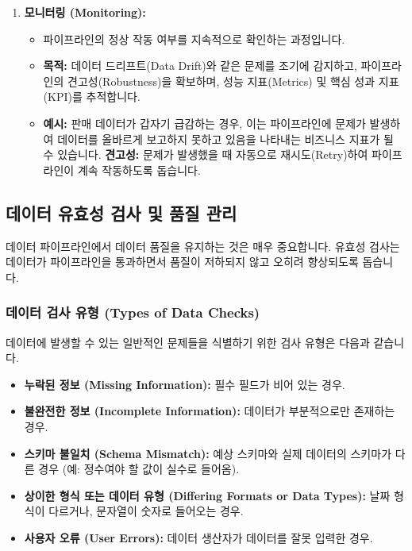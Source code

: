 \documentclass[11pt,a4paper]{article}
\theoremstyle{definition}
\begin{document}
\begin{enumerate}
\begin{enumerate}
    \item \textbf{모니터링 (Monitoring):}
    \begin{itemize}
        \item 파이프라인의 정상 작동 여부를 지속적으로 확인하는 과정입니다.
        \item \textbf{목적:} 데이터 드리프트(Data Drift)와 같은 문제를 조기에 감지하고, 파이프라인의 견고성(Robustness)을 확보하며, 성능 지표(Metrics) 및 핵심 성과 지표(KPI)를 추적합니다.
        \item \textbf{예시:} 판매 데이터가 갑자기 급감하는 경우, 이는 파이프라인에 문제가 발생하여 데이터를 올바르게 보고하지 못하고 있음을 나타내는 비즈니스 지표가 될 수 있습니다.
        \textbf{견고성:} 문제가 발생했을 때 자동으로 재시도(Retry)하여 파이프라인이 계속 작동하도록 돕습니다.
    \end{itemize}
\end{enumerate}

\subsection{데이터 유효성 검사 및 품질 관리}

데이터 파이프라인에서 데이터 품질을 유지하는 것은 매우 중요합니다. 유효성 검사는 데이터가 파이프라인을 통과하면서 품질이 저하되지 않고 오히려 향상되도록 돕습니다.

\subsubsection{데이터 검사 유형 (Types of Data Checks)}
데이터에 발생할 수 있는 일반적인 문제들을 식별하기 위한 검사 유형은 다음과 같습니다.

\begin{itemize}
    \item \textbf{누락된 정보 (Missing Information):} 필수 필드가 비어 있는 경우.
    \item \textbf{불완전한 정보 (Incomplete Information):} 데이터가 부분적으로만 존재하는 경우.
    \item \textbf{스키마 불일치 (Schema Mismatch):} 예상 스키마와 실제 데이터의 스키마가 다른 경우 (예: 정수여야 할 값이 실수로 들어옴).
    \item \textbf{상이한 형식 또는 데이터 유형 (Differing Formats or Data Types):} 날짜 형식이 다르거나, 문자열이 숫자로 들어오는 경우.
    \item \textbf{사용자 오류 (User Errors):} 데이터 생산자가 데이터를 잘못 입력한 경우.
\end{itemize}


\end{enumerate}
\end{document}
